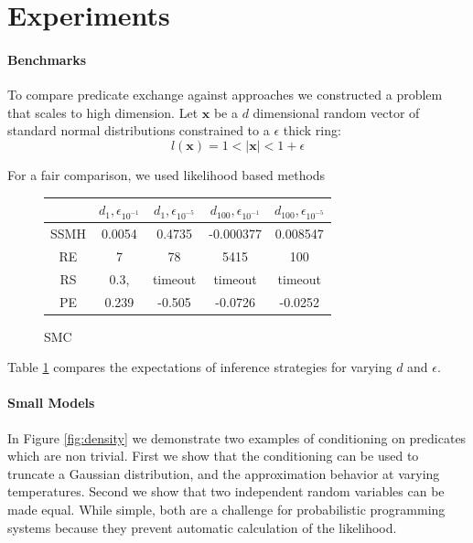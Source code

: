 
\section{Experiments}\label{experiments}

\paragraph{Benchmarks}
To compare predicate exchange against approaches we constructed a problem that scales to high dimension.
Let $\textbf{x}$ be a $d$ dimensional random vector of standard normal distributions constrained to a $\epsilon$ thick ring:
\begin{equation}
l(\textbf{x}) = 1 < |\textbf{x}| < 1 + \epsilon
\end{equation}

For a fair comparison, we used likelihood based methods


\begin{figure}
\begin{center}
	\begin{tabular}{||c| c c c c||} 
	\hline
	 & $d_1, \epsilon_{10^{-1}}$ & $d_1, \epsilon_{10^{-5}}$ & $d_{100}, \epsilon_{10^{-1}}$ & $d_{100}, \epsilon_{10^{-5}}$ \\ [0.5ex] 
	\hline\hline
	SSMH & 0.0054 & 0.4735  & -0.000377 & 0.008547\\ 
	\hline
	RE & 7 & 78 & 5415 & 100\\
	\hline
	RS & 0.3, & timeout & timeout & timeout \\
	\hline
	PE & 0.239 & -0.505 & -0.0726  & -0.0252 \\
	\hline
 \end{tabular}
 \label{results}
 \caption{SMC}
 \end{center}
\end{figure}
  
Table \ref{results} compares the expectations of inference strategies for varying $d$ and $\epsilon$.

\paragraph{Small Models}
In Figure \ref{fig:density} we demonstrate two examples of conditioning on predicates which are non trivial.
First we show that the conditioning can be used to truncate a Gaussian distribution, and the approximation behavior at varying temperatures.  Second we show that two independent random variables can be made equal.  While simple, both are a challenge for probabilistic programming systems because they prevent automatic calculation of the likelihood.

